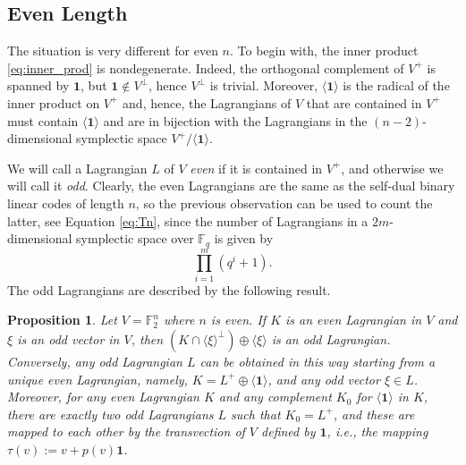 \documentclass[a4paper,reqno]{amsart}
\newcommand{\bydef}{:=}
\newcommand{\buno}{\mathbf{1}}
\newcommand{\FF}{\mathbb{F}}
\newtheorem{proposition}[theorem]{Proposition}
\theoremstyle{definition}
\theoremstyle{remark} \newtheorem{remark}[theorem]{Remark}
\numberwithin{equation}{section}
\begin{document}
\subsection{Even Length}

The situation is very different for even $n$. To begin with, the inner product \eqref{eq:inner_prod} is nondegenerate. 
Indeed, the orthogonal complement of $V^+$ is spanned by $\buno$, but $\buno\notin V^\perp$, hence $V^\perp$ is trivial. 
Moreover, $\langle\buno\rangle$ is the radical of the inner product on $V^+$ and, hence,  the Lagrangians of $V$ that are contained in $V^+$ must contain $\langle\buno\rangle$ and are in bijection with the Lagrangians in the $(n-2)$-dimensional symplectic space $V^+/\langle\buno\rangle$. 

We will call a Lagrangian $L$ of $V$ \emph{even} if it is contained in $V^+$, and otherwise we will call it \emph{odd}. Clearly, the even Lagrangians are the same as the self-dual binary linear codes of length $n$, so the previous observation can be used to count the latter, see Equation \eqref{eq:Tn}, since the number of Lagrangians in a \(2m\)-dimensional symplectic space over \(\mathbb{F}_q\) is given by
\begin{equation*}
    \prod_{i=1}^m(q^i+1).
\end{equation*}
The odd Lagrangians are described by the following result.

\begin{proposition}\label{prop:reduction_to_even}
Let $V=\FF_2^n$ where $n$ is even.
If $K$ is an even Lagrangian in $V$ and $\xi$ is an odd vector in $V$, then 
$(K\cap\langle\xi\rangle^\perp)\oplus\langle\xi\rangle$ is an odd Lagrangian.
Conversely, any odd Lagrangian $L$ can be obtained in this way starting from a unique even Lagrangian, namely, 
$K=L^+\oplus\langle\buno\rangle$, and any odd vector $\xi\in L$. 
Moreover, for any even Lagrangian $K$ and any complement $K_0$ for $\langle\buno\rangle$ in $K$, 
there are exactly two odd Lagrangians $L$ such that $K_0=L^+$, and these are mapped to each other by the transvection 
of $V$ defined by $\buno$, i.e., the mapping $\tau(v) \bydef v+p(v)\buno$.
\end{proposition}
\end{document}
